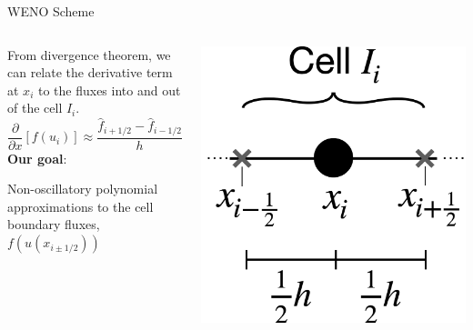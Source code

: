 \documentclass[10pt]{beamer}
\begin{document}
\begin{frame}{WENO Scheme}
\begin{columns}


  \begin{column}{0.65\textwidth}
    From divergence theorem, we can relate the derivative term at $x_i$ to the fluxes into and out of the cell $I_i$.
    $$
      \frac{\partial}{\partial x}[f(u_i)] \approx \frac{\hat{f}_{i+1 /2} - \hat{f}_{i-1/2}}{h}
    $$
    \textbf{Our goal}:

  Non-oscillatory polynomial approximations to the cell boundary fluxes, $f(u(x_{i\pm1/2}))$  
  \end{column}

  \begin{column}{0.3\textwidth}
  \vspace{\topsep}
  \includegraphics[scale=0.175]{CellGraphic.png}%
  \end{column}
    
  \end{columns}
\end{frame}
\end{document}
